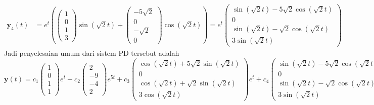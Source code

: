 \documentclass[a4paper]{article}
\theoremstyle{definisi}
\numberwithin{equation}{section}
\begin{document}
\begin{enumerate}
\begin{align*}
      \mathbf{y}_4(t) &= e^t\left(\begin{pmatrix}1\\0\\1\\3\end{pmatrix}\sin(\sqrt{2}t) + \begin{pmatrix}-5\sqrt{2}\\0\\-\sqrt{2}\\0\end{pmatrix}\cos(\sqrt{2}t)\right)= e^t\begin{pmatrix}\sin(\sqrt{2}t)-5\sqrt{2}\cos(\sqrt{2}t)\\0\\\sin(\sqrt{2}t)-\sqrt{2}\cos(\sqrt{2}t)\\3\sin(\sqrt{2}t)\end{pmatrix}
    \end{align*}
    Jadi penyelesaian umum dari sistem PD tersebut adalah
    \[\mathbf{y}(t) = c_1\begin{pmatrix}1\\0\\1\\1\end{pmatrix}e^t + c_2\begin{pmatrix}2\\-9\\-4\\2\end{pmatrix}e^{5t} + c_3\begin{pmatrix}\cos(\sqrt{2}t)+5\sqrt{2}\sin(\sqrt{2}t)\\0\\\cos(\sqrt{2}t)+\sqrt{2}\sin(\sqrt{2}t)\\3\cos(\sqrt{2}t)\end{pmatrix}e^t + c_4\begin{pmatrix}\sin(\sqrt{2}t)-5\sqrt{2}\cos(\sqrt{2}t)\\0\\\sin(\sqrt{2}t)-\sqrt{2}\cos(\sqrt{2}t)\\3\sin(\sqrt{2}t)\end{pmatrix}e^t.\]
    

\end{enumerate}
\end{document}
